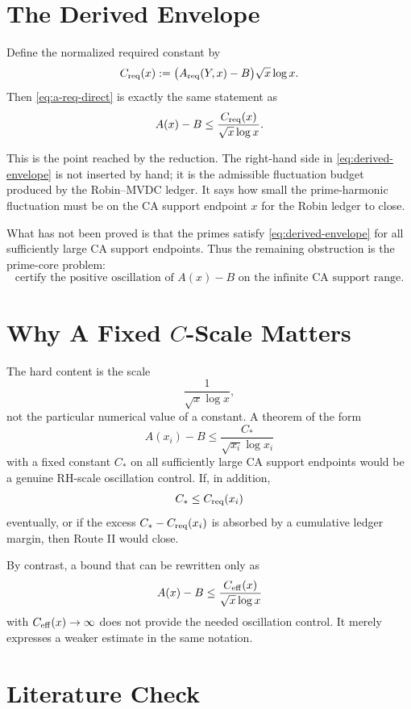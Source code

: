 \documentclass[11pt,a4paper]{article}
\begin{document}
\section{The Derived Envelope}

Define the normalized required constant by
\begin{equation}\label{eq:c-req}
  C_{\rm req}(x)
  :=
  \bigl(A_{\rm req}(Y,x)-B\bigr)\sqrt{x}\log x.
\end{equation}
Then \eqref{eq:a-req-direct} is exactly the same statement as
\begin{equation}\label{eq:derived-envelope}
  A(x)-B
  \le
  \frac{C_{\rm req}(x)}{\sqrt{x}\log x}.
\end{equation}

This is the point reached by the reduction. The right-hand side in
\eqref{eq:derived-envelope} is not inserted by hand; it is the admissible
fluctuation budget produced by the Robin--MVDC ledger. It says how small the
prime-harmonic fluctuation must be on the CA support endpoint \(x\) for the
Robin ledger to close.

What has not been proved is that the primes satisfy
\eqref{eq:derived-envelope} for all sufficiently large CA support endpoints.
Thus the remaining obstruction is the prime-core problem:
\[
  \text{certify the positive oscillation of }A(x)-B
  \text{ on the infinite CA support range.}
\]

\section{Why A Fixed \(C\)-Scale Matters}

The hard content is the scale
\[
  \frac{1}{\sqrt{x}\log x},
\]
not the particular numerical value of a constant. A theorem of the form
\[
  A(x_i)-B\le \frac{C_*}{\sqrt{x_i}\log x_i}
\]
with a fixed constant \(C_*\) on all sufficiently large CA support endpoints
would be a genuine RH-scale oscillation control. If, in addition,
\[
  C_*\le C_{\rm req}(x_i)
\]
eventually, or if the excess \(C_*-C_{\rm req}(x_i)\) is absorbed by a
cumulative ledger margin, then Route II would close.

By contrast, a bound that can be rewritten only as
\[
  A(x)-B\le \frac{C_{\rm eff}(x)}{\sqrt{x}\log x}
\]
with \(C_{\rm eff}(x)\to\infty\) does not provide the needed oscillation
control. It merely expresses a weaker estimate in the same notation.

\section{Literature Check}
\end{document}
